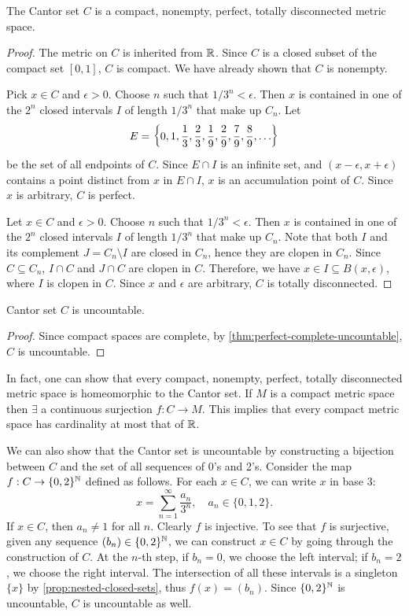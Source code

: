 \begin{thm}
    The Cantor set $C$ is a compact, nonempty, perfect, totally disconnected metric space.
    \begin{proof}
        The metric on $C$ is inherited from ${\mathbb R}$. Since $C$ is a closed subset of the compact set $[0, 1]$, $C$ is compact. We have already shown that $C$ is nonempty.

        Pick $x \in C$ and $\epsilon > 0$. Choose $n$ such that $1/3^n < \epsilon$. Then $x$ is contained in one of the $2^n$ closed intervals $I$ of length $1/3^n$ that make up $C_n$. Let
        \[
        E = {\left\{{0, 1, \frac13, \frac23, \frac19, \frac29, \frac79, \frac89, \ldots}\right\}}
        \]
        be the set of all endpoints of $C$. Since $E\cap I$ is an infinite set, and $(x - \epsilon, x + \epsilon)$ contains a point distinct from $x$ in $E\cap I$, $x$ is an accumulation point of $C$. Since $x$ is arbitrary, $C$ is perfect.

        Let $x \in C$ and $\epsilon > 0$. Choose $n$ such that $1/3^n < \epsilon$. Then $x$ is contained in one of the $2^n$ closed intervals $I$ of length $1/3^n$ that make up $C_n$. Note that both $I$ and its complement $J = C_n \setminus I$ are closed in $C_n$, hence they are clopen in $C_n$. Since $C \subseteq C_n$, $I \cap C$ and $J \cap C$ are clopen in $C$. Therefore, we have $x \in I \subseteq B(x, \epsilon)$, where $I$ is clopen in $C$. Since $x$ and $\epsilon$ are arbitrary, $C$ is totally disconnected.
    \end{proof}
\end{thm}

\begin{cl}
    Cantor set $C$ is uncountable.
    \begin{proof}
        Since compact spaces are complete, by \ref{thm:perfect-complete-uncountable}, $C$ is uncountable.
    \end{proof}
\end{cl}

\begin{rmk}
    In fact, one can show that every compact, nonempty, perfect, totally disconnected metric space is homeomorphic to the Cantor set. If $M$ is a compact metric space then $\exists$ a continuous surjection $f: C \to M$. This implies that every compact metric space has cardinality at most that of ${\mathbb R}$.
\end{rmk}

We can also show that the Cantor set is uncountable by constructing a bijection between $C$ and the set of all sequences of 0's and 2's. Consider the map $f: C \to \{0, 2\}^{\mathbb N}$ defined as follows. For each $x \in C$, we can write $x$ in base 3:
\[
x = \sum_{n=1}^\infty \frac{a_n}{3^n}, \quad a_n \in \{0, 1, 2\}.
\]
If $x \in C$, then $a_n \neq 1$ for all $n$. Clearly $f$ is injective. To see that $f$ is surjective, given any sequence $(b_n) \in \{0, 2\}^{\mathbb N}$, we can construct $x \in C$ by going through the construction of $C$. At the $n$-th step, if $b_n = 0$, we choose the left interval; if $b_n = 2$, we choose the right interval. The intersection of all these intervals is a singleton $\{x\}$ by \ref{prop:nested-closed-sets}, thus $f(x) = (b_n)$. Since $\{0, 2\}^{\mathbb N}$ is uncountable, $C$ is uncountable as well.

